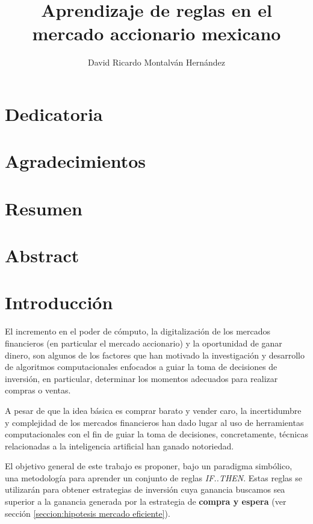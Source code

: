 \documentclass[onesided, 12pt]{scrbook}
\title{Aprendizaje de reglas en el mercado accionario mexicano}
\date{}
\author{David Ricardo Montalván Hernández}
\theoremstyle{break}
\begin{document}
\maketitle
{} %
\renewcommand{\contentsname}{Contenido}
\tableofcontents
\renewcommand{\listfigurename}{Lista de imágenes}
\listoffigures
\renewcommand{\listtablename}{Lista de tablas}
\listoftables
\chapter*{Dedicatoria}
\chapter*{Agradecimientos}
\chapter*{Resumen}
\chapter*{Abstract}


\chapter{Introducción}
\label{capitulo:introduccion}
El incremento en el poder de cómputo, la digitalización de los mercados financieros (en particular el mercado accionario) y la oportunidad de ganar dinero, son algunos de los factores que han motivado la investigación y desarrollo de algoritmos computacionales enfocados a guiar la toma de decisiones de inversión, en particular, determinar los momentos adecuados para realizar compras o ventas.

A pesar de que la idea básica es comprar barato y vender caro, la incertidumbre y complejidad de los mercados financieros han dado lugar al uso de herramientas computacionales con el fin de guiar la toma de decisiones, concretamente, técnicas relacionadas a la inteligencia artificial han ganado notoriedad.

El objetivo general de este trabajo es proponer, bajo un paradigma simbólico, una metodología para aprender un conjunto de reglas \textit{IF..THEN}. Estas reglas se utilizarán para obtener estrategias de inversión cuya ganancia buscamos sea superior a la ganancia generada por la estrategia de \textbf{compra y espera} (ver sección \ref{seccion:hipotesis mercado eficiente}).
\end{document}

